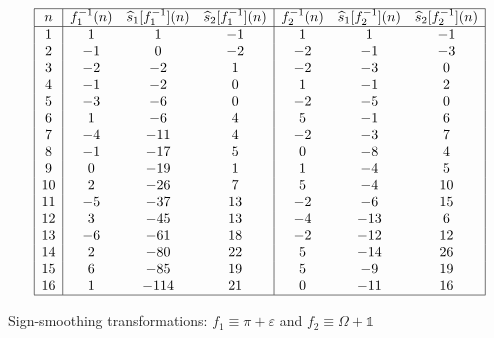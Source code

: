\documentclass[12pt,reqno,a4letter]{article}
\numberwithin{figure}{section}
\numberwithin{table}{section}
\numberwithin{equation}{section}
\theoremstyle{plain}
\numberwithin{theorem}{section}
\theoremstyle{definition}
\begin{document}
\begin{table}[h!]
\begin{equation*}
\begin{array}{|c|ccc|ccc|} 
 \hline
 n & f_1^{-1}(n) & \widehat{s}_1[f_1^{-1}](n) & \widehat{s}_2[f_1^{-1}](n) & 
     f_2^{-1}(n) & \widehat{s}_1[f_2^{-1}](n) & 
     \widehat{s}_2[f_2^{-1}](n) \\ \hline
 1 & 1 & 1 & -1 & 1 & 1 & -1 \\
 2 & -1 & 0 & -2 & -2 & -1 & -3 \\
 3 & -2 & -2 & 1 & -2 & -3 & 0 \\
 4 & -1 & -2 & 0 & 1 & -1 & 2 \\
 5 & -3 & -6 & 0 & -2 & -5 & 0 \\
 6 & 1 & -6 & 4 & 5 & -1 & 6 \\
 7 & -4 & -11 & 4 & -2 & -3 & 7 \\
 8 & -1 & -17 & 5 & 0 & -8 & 4 \\
 9 & 0 & -19 & 1 & 1 & -4 & 5 \\
 10 & 2 & -26 & 7 & 5 & -4 & 10 \\
 11 & -5 & -37 & 13 & -2 & -6 & 15 \\
 12 & 3 & -45 & 13 & -4 & -13 & 6 \\
 13 & -6 & -61 & 18 & -2 & -12 & 12 \\
 14 & 2 & -80 & 22 & 5 & -14 & 26 \\
 15 & 6 & -85 & 19 & 5 & -9 & 19 \\
 16 & 1 & -114 & 21 & 0 & -11 & 16 \\
 \hline
\end{array}
\end{equation*}
\caption{Sign-smoothing transformations: $f_1 \equiv \pi + \varepsilon$ and $f_2 \equiv \Omega + \mathds{1}$}
\label{table_s12fn_SignSmoothingTF_v3}
\end{table}
\end{document}
